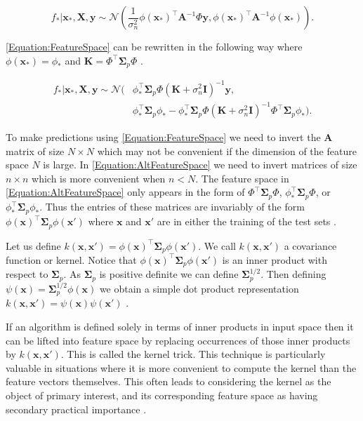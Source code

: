 \documentclass[../../../main.tex]{subfiles}
\begin{document}
\begin{equation}
f_\ast|\bm{x}_\ast,\bm{X},\bm{y} \sim \mathcal{N}\left(\frac{1}{\sigma_n^2}\phi(\bm{x}_\ast)^\top\bm{A}^{-1}\Phi\bm{y},\phi(\bm{x}_\ast)^\top\bm{A}^{-1}\phi(\bm{x}_\ast)\right).
\label{Equation:FeatureSpace}
\end{equation}

\autoref{Equation:FeatureSpace} can be rewritten in the following way where $\phi(\bm{x}_\ast)=\phi_\ast$ and $\bm{K}=\Phi^\top\bm{\Sigma}_p\Phi$ \autocite{Rasmussen2005}.

\begin{equation}
\begin{split}
f_\ast|\bm{x}_\ast,\bm{X},\bm{y} \sim \mathcal{N}(&\phi_\ast^\top\bm{\Sigma}_p\Phi(\bm{K}+\sigma_n^2\bm{I})^{-1}\bm{y},\\
&\phi_\ast^\top\bm{\Sigma}_p\phi_\ast-\phi_\ast^\top\bm{\Sigma}_p\Phi(\bm{K}+\sigma_n^2\bm{I})^{-1}\Phi^\top\bm{\Sigma}_p\phi_\ast).
\end{split}
\label{Equation:AltFeatureSpace}
\end{equation}

To make predictions using \autoref{Equation:FeatureSpace} we need to invert the $\bm{A}$ matrix of size $N \times N$ which may not be convenient if the dimension of the feature space $N$ is large. In \autoref{Equation:AltFeatureSpace} we need to invert matrices of size $n \times n$ which is more convenient when $n < N$. The feature space in \autoref{Equation:AltFeatureSpace} only appears in the form of $\Phi^\top\bm{\Sigma}_p\Phi$, $\phi_\ast^\top\bm{\Sigma}_p\Phi$, or $\phi_\ast^\top\bm{\Sigma}_p\phi_\ast$. Thus the entries of these matrices are invariably of the form $\phi(\bm{x})^\top\bm{\Sigma}_p\phi(\bm{x}')$ where $\bm{x}$ and $\bm{x}'$ are in either the training of the test sets \autocite{Rasmussen2005}.

Let us define $k(\bm{x},\bm{x}') = \phi(\bm{x})^\top\bm{\Sigma}_p\phi(\bm{x}')$. We call $k(\bm{x},\bm{x}')$ a covariance function or kernel. Notice that $\phi(\bm{x})^\top\bm{\Sigma}_p\phi(\bm{x}')$ is an inner product with respect to $\bm{\Sigma}_p$. As $\bm{\Sigma}_p$ is positive definite we can define $\bm{\Sigma}_p^{1/2}$. Then defining $\psi(\bm{x})=\bm{\Sigma}_p^{1/2}\phi(\bm{x})$ we obtain a simple dot product representation $k(\bm{x},\bm{x}')=\psi(\bm{x})\psi(\bm{x}')$ \autocite{Rasmussen2005}.

If an algorithm is defined solely in terms of inner products in input space then it can be lifted into feature space by replacing occurrences of those inner products by $k(\bm{x},\bm{x}')$. This is called the kernel trick. This technique is particularly valuable in situations where it is more convenient to compute the kernel than the feature vectors themselves. This often leads to considering the kernel as the object of primary interest, and its corresponding feature space as having secondary practical importance \autocite{Rasmussen2005}.
\end{document}
